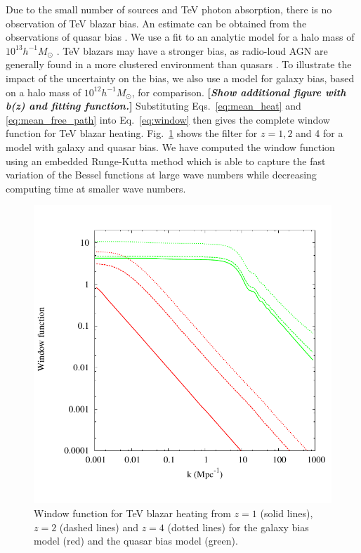 \documentclass[twocolumns]{emulateapj}
\newcommand\Cc[1]{{\color{blue} \bf #1}} %
\begin{document}
Due to the small number of sources and TeV photon absorption, there is no observation of TeV blazar bias. An estimate can be obtained from the observations of quasar bias \citep{2005MNRAS.356..415C,2007ApJ...658...85M,2007AJ....133.2222S}. We use a fit to an analytic model for a halo mass of $10^{13}h^{-1}M_{\odot}$ \citep{2008ApJ...678..627B}. TeV blazars may have a stronger bias, as radio-loud AGN are generally found in a more clustered environment than quasars \citep{2009MNRAS.393..377M,2012MNRAS.421.3060S}. To illustrate the impact of the uncertainty on the bias, we also use a model for galaxy bias, based on a halo mass of $10^{12}h^{-1} M_{\odot}$, for comparison.
\Cc{[{\em Show additional figure with b(z) and fitting function.}]}
Substituting Eqs.~\eqref{eq:mean_heat} and \ref{eq:mean_free_path} into Eq.~\eqref{eq:window} then gives the complete window function for TeV blazar heating. Fig.~\ref{fig:window} shows the filter for $z=1,2$ and 4 for a model with galaxy and quasar bias. We have computed the window function using an embedded Runge-Kutta method which is able to capture the fast variation of the Bessel functions at large wave numbers while decreasing computing time at smaller wave numbers.
\begin{figure}[h]
\centering
\includegraphics[width = .45\textwidth ]{window_gal_qso-eps-converted-to}
\caption{Window function for TeV blazar heating from $z=1$ (solid lines), $z=2$ (dashed lines) and $z=4$ (dotted lines) for the galaxy bias model (red) and the quasar bias model (green).}
\label{fig:window}
\end{figure}
\end{document}
